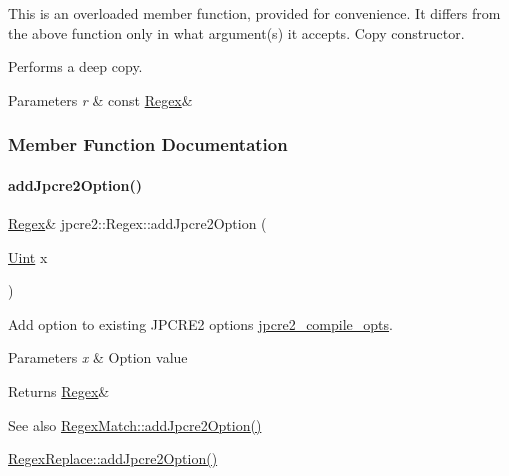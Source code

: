 This is an overloaded member function, provided for convenience. It differs from the above function only in what argument(s) it accepts. Copy constructor. 

Performs a deep copy. 
\begin{DoxyParams}{Parameters}
{\em r} & const \hyperlink{classjpcre2_1_1Regex}{Regex}\& \\
\hline
\end{DoxyParams}


\subsubsection{Member Function Documentation}
\hypertarget{classjpcre2_1_1Regex_a03974fa7ba8f7c47186cb8d6f54934de_a03974fa7ba8f7c47186cb8d6f54934de}{}\label{classjpcre2_1_1Regex_a03974fa7ba8f7c47186cb8d6f54934de_a03974fa7ba8f7c47186cb8d6f54934de} 
\paragraph{\texorpdfstring{add\+Jpcre2\+Option()}{addJpcre2Option()}}
{\footnotesize\ttfamily \hyperlink{classjpcre2_1_1Regex}{Regex}\& jpcre2\+::\+Regex\+::add\+Jpcre2\+Option (\begin{DoxyParamCaption}\item[{\hyperlink{namespacejpcre2_a078242d38221a13fb3543b9edd78c099}{Uint}}]{x }\end{DoxyParamCaption})\hspace{0.3cm}{\ttfamily [inline]}}



Add option to existing J\+P\+C\+R\+E2 options \hyperlink{classjpcre2_1_1Regex_abdd26c3bc1c3132f0aa73dde1690a7ef}{jpcre2\+\_\+compile\+\_\+opts}. 


\begin{DoxyParams}{Parameters}
{\em x} & Option value \\
\hline
\end{DoxyParams}
\begin{DoxyReturn}{Returns}
\hyperlink{classjpcre2_1_1Regex}{Regex}\& 
\end{DoxyReturn}
\begin{DoxySeeAlso}{See also}
\hyperlink{classjpcre2_1_1RegexMatch_a0a4cf8554a7e00f3cf2db34f60a43f60_a0a4cf8554a7e00f3cf2db34f60a43f60}{Regex\+Match\+::add\+Jpcre2\+Option()} 

\hyperlink{classjpcre2_1_1RegexReplace_a3f86b1e11d08d0153a08244771e59061_a3f86b1e11d08d0153a08244771e59061}{Regex\+Replace\+::add\+Jpcre2\+Option()} 
\end{DoxySeeAlso}
\hypertarget{classjpcre2_1_1Regex_ab1af1471339602446d8221b8c97c6b55_ab1af1471339602446d8221b8c97c6b55}{}\label{classjpcre2_1_1Regex_ab1af1471339602446d8221b8c97c6b55_ab1af1471339602446d8221b8c97c6b55} 

